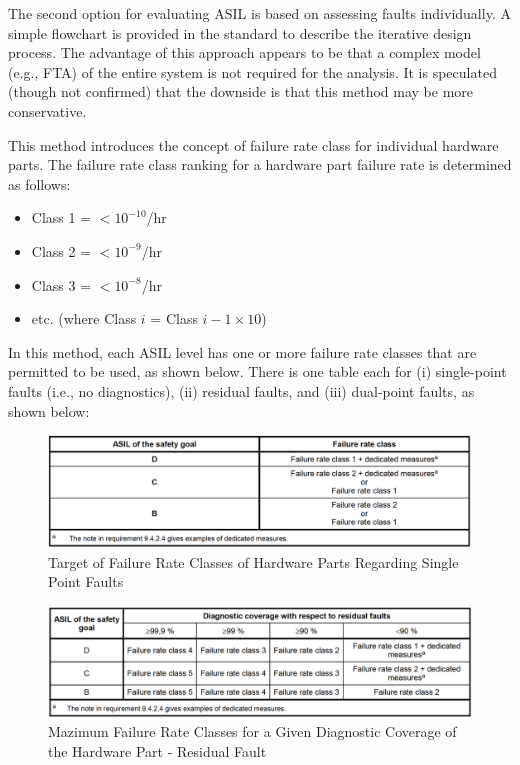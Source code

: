 \documentclass[./dissertation.tex]{subfiles}
\begin{document}
The second option for evaluating ASIL is based on assessing faults individually. A simple flowchart is provided in the standard to describe the iterative design process. The advantage of this approach appears to be that a complex model (e.g., FTA) of the entire system is not required for the analysis. It is speculated (though not confirmed) that the downside is that this method may be more conservative.

This method introduces the concept of failure rate class for individual hardware parts. The failure rate class ranking for a hardware part failure rate is determined as follows:

\begin{itemize}
\item Class 1 = $<10^{-10}$/hr
\item Class 2 = $<10^{-9}$/hr
\item Class 3 = $<10^{-8}$/hr
\item etc. (where Class $i$ = Class $i-1 \times 10$)
\end{itemize}

In this method, each ASIL level has one or more failure rate classes that are permitted to be used, as shown below. There is one table each for (i) single-point faults (i.e., no diagnostics), (ii) residual faults, and (iii) dual-point faults, as shown below:


\begin{figure}[H]
\centering
\includegraphics[width=\linewidth]{subfiles/imgs/asil-t-7.png}
\caption{Target of Failure Rate Classes of Hardware Parts Regarding Single Point Faults}
\label{fig:asil-t-7}
\end{figure}

\begin{figure}[H]
\centering
\includegraphics[width=\linewidth]{subfiles/imgs/asil-t-8.png}
\caption{Mazimum Failure Rate Classes for a Given Diagnostic Coverage of the Hardware Part - Residual Fault}
\label{fig:asil-t-8}
\end{figure}
\end{document}
